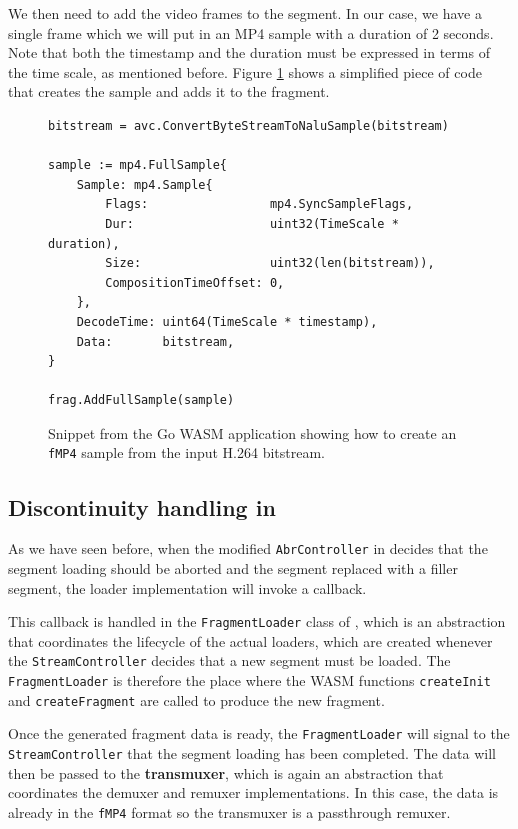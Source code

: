 We then need to add the video frames to the segment. In our case, we have a single frame which we will put in an MP4 sample with a duration of 2 seconds. Note that both the timestamp and the duration must be expressed in terms of the time scale, as mentioned before. Figure \ref{fig:wasm_go_fragment} shows a simplified piece of code that creates the sample and adds it to the fragment.

\begin{figure}[h]
    \centering
    \begin{verbatim}
bitstream = avc.ConvertByteStreamToNaluSample(bitstream)

sample := mp4.FullSample{
	Sample: mp4.Sample{
		Flags:                 mp4.SyncSampleFlags,
		Dur:                   uint32(TimeScale * duration),
		Size:                  uint32(len(bitstream)),
		CompositionTimeOffset: 0,
	},
	DecodeTime: uint64(TimeScale * timestamp),
	Data:       bitstream,
}

frag.AddFullSample(sample)
    \end{verbatim}
    \caption{Snippet from the Go WASM application showing how to create an \texttt{fMP4} sample from the input H.264 bitstream.}
    \label{fig:wasm_go_fragment}
\end{figure}

\subsection{Discontinuity handling in \hlsjs{}}
\label{sec:improvements/impl/discontinuities}

As we have seen before, when the modified \texttt{AbrController} in \hlsjs{} decides that the segment loading should be aborted and the segment replaced with a filler segment, the loader implementation will invoke a callback.

This callback is handled in the \texttt{FragmentLoader} class of \hlsjs{}, which is an abstraction that coordinates the lifecycle of the actual loaders, which are created whenever the \texttt{StreamController} decides that a new segment must be loaded. The \texttt{FragmentLoader} is therefore the place where the WASM functions \texttt{createInit} and \texttt{createFragment} are called to produce the new fragment.

Once the generated fragment data is ready, the \texttt{FragmentLoader} will signal to the \texttt{StreamController} that the segment loading has been completed. The data will then be passed to the \textbf{transmuxer}, which is again an abstraction that coordinates the demuxer and remuxer implementations. In this case, the data is already in the \texttt{fMP4} format so the transmuxer is a passthrough remuxer.

